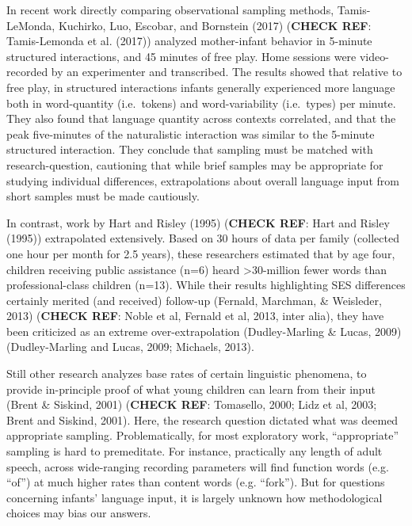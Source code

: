 \documentclass[floatsintext,man]{apa6}
\theoremstyle{definition}
\theoremstyle{definition}
\theoremstyle{definition}
\theoremstyle{remark}
\begin{document}
In recent work directly comparing observational sampling methods,
Tamis-LeMonda, Kuchirko, Luo, Escobar, and Bornstein (2017)
(\textbf{CHECK REF}: Tamis-Lemonda et al. (2017)) analyzed mother-infant
behavior in 5-minute structured interactions, and 45 minutes of free
play. Home sessions were video-recorded by an experimenter and
transcribed. The results showed that relative to free play, in
structured interactions infants generally experienced more language both
in word-quantity (i.e.~tokens) and word-variability (i.e.~types) per
minute. They also found that language quantity across contexts
correlated, and that the peak five-minutes of the naturalistic
interaction was similar to the 5-minute structured interaction. They
conclude that sampling must be matched with research-question,
cautioning that while brief samples may be appropriate for studying
individual differences, extrapolations about overall language input from
short samples must be made cautiously.

In contrast, work by Hart and Risley (1995) (\textbf{CHECK REF}: Hart
and Risley (1995)) extrapolated extensively. Based on 30 hours of data
per family (collected one hour per month for 2.5 years), these
researchers estimated that by age four, children receiving public
assistance (n=6) heard \textgreater{}30-million fewer words than
professional-class children (n=13). While their results highlighting SES
differences certainly merited (and received) follow-up (Fernald,
Marchman, \& Weisleder, 2013) (\textbf{CHECK REF}: Noble et al, Fernald
et al, 2013, inter alia), they have been criticized as an extreme
over-extrapolation (Dudley-Marling \& Lucas, 2009) (Dudley-Marling and
Lucas, 2009; Michaels, 2013).

Still other research analyzes base rates of certain linguistic
phenomena, to provide in-principle proof of what young children can
learn from their input (Brent \& Siskind, 2001) (\textbf{CHECK REF}:
Tomasello, 2000; Lidz et al, 2003; Brent and Siskind, 2001). Here, the
research question dictated what was deemed appropriate sampling.
Problematically, for most exploratory work, \enquote{appropriate}
sampling is hard to premeditate. For instance, practically any length of
adult speech, across wide-ranging recording parameters will find
function words (e.g. \enquote{of}) at much higher rates than content
words (e.g. \enquote{fork}). But for questions concerning infants'
language input, it is largely unknown how methodological choices may
bias our answers.
\end{document}
